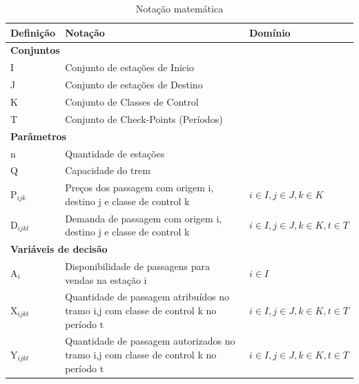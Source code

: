 \begin{table}[h]
	\centering
	\small
	\begin{tabular}{p{2cm} p{9.5cm} p{3.2cm}}
		\toprule
		\textbf{Definição} & \textbf{Notação}                                                                     & \textbf{Domínio}                     \\ \midrule
		\multicolumn{3}{l}{\textbf{Conjuntos}}                                                                                                           \\ \midrule
		I                  & Conjunto de estações de Inicio                                                       &                                      \\
		J                  & Conjunto de estações de Destino                                                      &                                      \\
		K                  & Conjunto de Classes de Control                                                       &                                      \\
		T                  & Conjunto de Check-Points (Períodos)                                                  &                                      \\ \midrule
		\multicolumn{3}{l}{\textbf{Parâmetros}}                                                                                                          \\ \midrule
		n                  & Quantidade de estações                                                               &                                      \\
		Q                  & Capacidade do trem                                                                   &                                      \\
		P$_{ijk}$          & Preços  dos passagem com origem i, destino j e classe de control k                   & $i \in I, j \in J, k \in K$          \\
		D$_{ijkt}$         & Demanda  de passagem com origem i, destino j e classe de control k                   & $i \in I, j \in J, k \in K, t \in T$ \\ \midrule
		\multicolumn{3}{l}{\textbf{Variáveis de decisão}}                                                                                                \\ \midrule
		A$_{i}$            & Disponibilidade de passagens para vendas na estação i                                & $i \in I$                            \\
		X$_{ijkt}$         & Quantidade de passagem atribuídos no tramo i,j com classe de control k no período t  & $i \in I, j \in J, k \in K, t \in T$ \\
		Y$_{ijkt}$         & Quantidade de passagem autorizados no tramo i,j com classe de control k no período t & $i \in I, j \in J, k \in K, t \in T$ \\ \bottomrule
	\end{tabular}
	\caption{Notação matemática}
	\label{Notacao}
\end{table}

